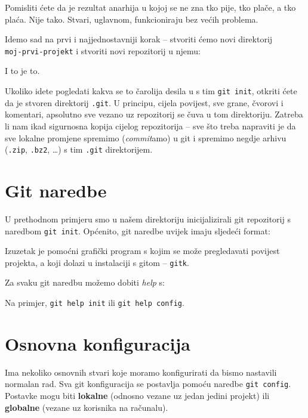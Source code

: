 Pomisliti ćete da je rezultat anarhija u kojoj se ne zna tko pije, tko plače, a tko plaća. 
Nije tako.
Stvari, uglavnom, funkcioniraju bez većih problema.

Idemo sad na prvi i najjednostavniji korak -- stvoriti ćemo novi direktorij \\ \verb+moj-prvi-projekt+ i stvoriti novi repozitorij u njemu:



I to je to. 

Ukoliko idete pogledati kakva se to čarolija desila u s tim \verb+git init+, otkriti ćete da je stvoren direktorij \verb+.git+.
U principu, cijela povijest, sve grane, čvorovi i komentari, apsolutno sve vezano uz repozitorij se čuva u tom direktoriju.
Zatreba li nam ikad sigurnosna kopija cijelog repozitorija -- sve što treba napraviti je da sve lokalne promjene spremimo (\emph{commit}amo) u git i spremimo negdje arhivu (\verb+.zip+, \verb+.bz2+, \dots) s tim \verb+.git+ direktorijem.

\section*{Git naredbe}

U prethodnom primjeru smo u našem direktoriju inicijalizirali git repozitorij s naredbom \verb+git init+.
Općenito, git naredbe uvijek imaju sljedeći format:

\gitoutput{
\color{blue}{git $<$naredba$>$ $<$opcija1$>$ $<$opcija2$>$ \dots}
}

Izuzetak je pomoćni grafički program s kojim se može pregledavati povijest projekta, a koji dolazi u instalaciji s gitom -- \verb+gitk+.

Za svaku git naredbu možemo dobiti \emph{help} s:


Na primjer, \verb+git help init+ ili \verb+git help config+.

\section*{Osnovna konfiguracija}

Ima nekoliko osnovnih stvari koje moramo konfigurirati da bismo nastavili normalan rad. 
Sva git konfiguracija se postavlja pomoću naredbe \verb+git config+. 
Postavke mogu biti \textbf{lokalne} (odnosno vezane uz jedan jedini projekt) ili \textbf{globalne} (vezane uz korisnika na računalu).

